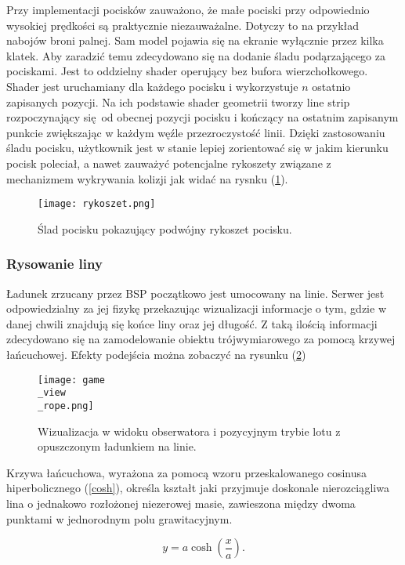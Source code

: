 Przy implementacji pocisków zauważono, że małe pociski przy odpowiednio wysokiej prędkości są praktycznie niezauważalne. Dotyczy to na przykład nabojów broni palnej. Sam model pojawia się na ekranie wyłącznie przez kilka klatek. Aby zaradzić temu zdecydowano się na dodanie śladu podąrzającego za pociskami. Jest to oddzielny shader operujący bez bufora wierzchołkowego. Shader jest uruchamiany dla każdego pocisku i wykorzystuje $n$ ostatnio zapisanych pozycji. Na ich podstawie shader geometrii tworzy line strip rozpoczynający się od obecnej pozycji pocisku i kończący na ostatnim zapisanym punkcie zwiększając w każdym węźle przezroczystość linii. Dzięki zastosowaniu śladu pocisku, użytkownik jest w stanie lepiej zorientować się w jakim kierunku pocisk poleciał, a nawet zauważyć potencjalne rykoszety związane z mechanizmem wykrywania kolizji jak widać na rysnku (\ref{rykoszet}).

\begin{figure}[h]
	\centering
	\texttt{[image: rykoszet.png]}
	\caption{Ślad pocisku pokazujący podwójny rykoszet pocisku.}
	\label{rykoszet}
\end{figure}

\subsubsection{Rysowanie liny}

Ładunek zrzucany przez BSP początkowo jest umocowany na linie. Serwer jest odpowiedzialny za jej fizykę przekazując wizualizacji informacje o tym, gdzie w danej chwili znajdują się końce liny oraz jej długość. Z taką ilością informacji zdecydowano się na zamodelowanie obiektu trójwymiarowego za pomocą krzywej łańcuchowej. Efekty podejścia można zobaczyć na rysunku (\ref{gui_game4})
\\

\begin{figure}[!h]
	\centering
	\texttt{[image: game\\\_view\\\_rope.png]}
	\caption{Wizualizacja w widoku obserwatora i pozycyjnym trybie lotu z opuszczonym ładunkiem na linie.}
	\label{gui_game4}
\end{figure}

Krzywa łańcuchowa, wyrażona za pomocą wzoru przeskalowanego cosinusa hiperbolicznego (\ref{cosh}), określa kształt jaki przyjmuje doskonale nierozciągliwa lina o jednakowo rozłożonej niezerowej masie, zawieszona między dwoma punktami w jednorodnym polu grawitacyjnym.

\begin{equation}
	\label{cosh}
	y = a \cosh \left( \frac{x}{a} \right).
\end{equation}

